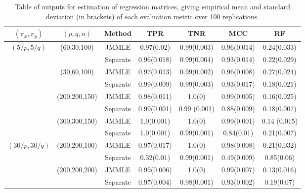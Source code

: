 \begin{scriptsize}
\begin{table}
    \begin{tabular}{ccccccc}
    \hline
    $(\pi_x, \pi_y)$ & $(p,q,n)$   & Method   & TPR            & TNR            & MCC & RF            \\ \hline
    $(5/p, 5/q)$   & (60,30,100)   & JMMLE    & 0.97(0.02)  & 0.99(0.003)  & 0.96(0.014) & 0.24(0.033) \\
    ~              & ~             & Separate & 0.96(0.018) & 0.99(0.004)  & 0.93(0.014) & 0.22(0.029) \\\cline{2-7}
    ~              & (30,60,100)   & JMMLE    & 0.97(0.013) & 0.99(0.002)  & 0.96(0.008) & 0.27(0.024) \\
    ~              & ~             & Separate & 0.99(0.009) & 0.99(0.003)  & 0.93(0.017) & 0.18(0.021) \\\cline{2-7}
    ~              & (200,200,150) & JMMLE    & 0.98(0.011) & 1.0(0)       & 0.99(0.005) & 0.16(0.025) \\
    ~              & ~             & Separate & 0.99(0.001) & 0.99 (0.001) & 0.88(0.009) & 0.18(0.007) \\\cline{2-7}
    ~              & (300,300,150) & JMMLE    & 1.0(0.001)  & 1.0(0)       & 0.99(0.001) & 0.14 (0.015)\\
    ~              & ~             & Separate & 1.0(0.001)  & 0.99(0.001)  & 0.84(0.01)  & 0.21(0.007)\\\hline
    $(30/p, 30/q)$ & (200,200,100) & JMMLE    & 0.97(0.017) & 1.0(0)       & 0.98(0.008) & 0.21(0.032) \\
    ~              & ~             & Separate & 0.32(0.01)  & 0.99(0.001)  & 0.49(0.009) & 0.85(0.06)  \\\cline{2-7}
    ~              & (200,200,200) & JMMLE    & 0.99(0.006) & 1.0(0)       & 0.99(0.007) & 0.13(0.016) \\
    ~              & ~             & Separate & 0.97(0.004) & 0.98(0.001)  & 0.93(0.002) & 0.19(0.07)  \\    \hline
    \end{tabular}
    \caption{Table of outputs for estimation of regression matrices, giving empirical mean and standard deviation (in brackets) of each evaluation metric over 100 replications.}
    \label{table:simtable11}
\end{table}


\end{scriptsize}
